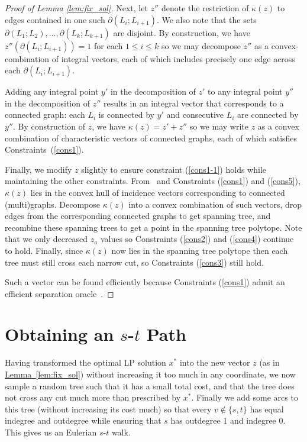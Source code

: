 \documentclass[11pt]{article}
\newcommand{\lref}[2][]{\hyperref[#2]{#1~\ref*{#2}}}
\theoremstyle{definition}
\newcounter{note}[section]
\begin{document}
\begin{proof}[Proof of Lemma \ref{lem:fix_sol}]
Next, let $z''$ denote the restriction of $\kappa(z)$ to edges contained
in one such $\partial(L_i; L_{i+1})$.  We also note that the sets
$\partial(L_1; L_2), \ldots, \partial(L_k; L_{k+1})$ are disjoint.  By
construction, we have $z''(\partial(L_i; L_{i+1})) = 1$ for each $1 \leq
i \leq k$ so we may decompose $z''$ as a convex-combination of integral
vectors, each of which includes precisely one edge across each
$\partial(L_i; L_{i+1})$.

Adding any integral point $y'$ in the decomposition of $z'$ to any
integral point $y''$ in the decomposition of $z''$ results
in an integral vector that corresponds to a connected graph:
each $L_i$ is connected by $y'$ and consecutive $L_i$ are connected
by $y''$. By construction of $z$, we have $\kappa(z) = z' + z''$
so we may write $z$ as a convex combination of characteristic vectors
of connected graphs, each of which satisfies Constraints~(\ref{cons1}).

Finally, we modify $z$ slightly to ensure constraint (\ref{cons1-1}) holds while maintaining
the other constraints. From~\cite[Corollary~50.8a]{Schrijver-book} and
Constraints (\ref{cons1}) and (\ref{cons5}),
$\kappa(z)$ lies in the convex hull of incidence vectors corresponding to connected
(multi)graphs. Decompose $\kappa(z)$ into a convex combination of such vectors,
drop edges from the corresponding connected graphs to get spanning tree,
and recombine these spanning trees to get a point in the spanning
tree polytope. Note that we only decreased $z_a$ values
so Constraints (\ref{cons2}) and (\ref{cons4}) continue to hold.
Finally, since $\kappa(z)$ now lies in the spanning tree polytope
then each tree must still cross each narrow cut, so Constraints (\ref{cons3}) still hold.

Such a vector can be found efficiently because Constraints (\ref{cons1}) admit
an efficient separation oracle~\cite[Corollary~51.3b]{Schrijver-book}.
\end{proof}








\section{Obtaining an $s$-$t$ Path}
\label{sec:patching}


Having transformed the optimal LP solution $x^*$ into the new vector $z$
(as in \lref[Lemma]{lem:fix_sol}) without increasing it too much in any
coordinate, we now sample a random tree such that it has a small total
cost, and that the tree does not cross any cut much more than prescribed
by $x^*$. Finally we add some arcs to this tree (without increasing its
cost much) so that every $v \not\in \{s,t\}$ has equal indegree and outdegree
while ensuring that $s$ has outdegree 1 and indegree 0.
This gives us an Eulerian $s$-$t$ walk.
\end{document}
